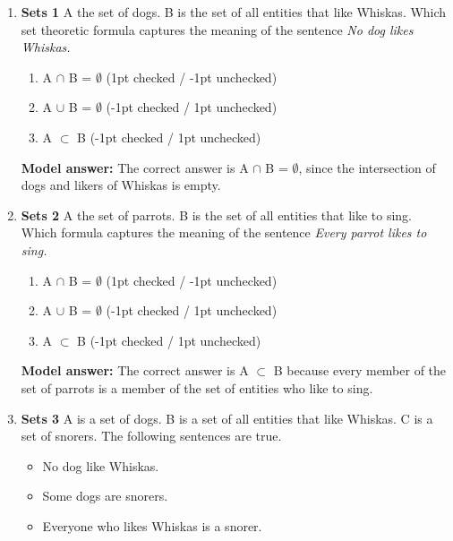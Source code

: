 \documentclass[a4,11pt]{article}
\begin{document}
\begin{enumerate}[leftmargin = 12pt]
{\bf Model answer:}  The correct answer is \textit{Some dogs like Whiskas}, since the intersection between the set of dogs and the set of entities that like Whiskas is not empty.


\item {\bf Sets 1} A  the set of dogs. B is the set of all entities that like Whiskas. Which set theoretic formula captures the meaning of the sentence \textit{No dog likes Whiskas.}

      \begin{enumerate}[noitemsep]
        \item A $\cap$ B = $\emptyset$ (1pt checked / -1pt unchecked)
	\item A $\cup$ B = $\emptyset$  (-1pt checked / 1pt unchecked)
        \item A $\subset$ B (-1pt checked / 1pt unchecked)
	\end{enumerate}	
	
{\bf Model answer:}  The correct answer is  A $\cap$ B = $\emptyset$, since the intersection of dogs and likers of Whiskas is empty. 


\item {\bf Sets 2} A  the set of parrots. B is the set of all entities that like to sing. Which formula captures the meaning of the sentence \textit{Every parrot likes to sing.}

        \begin{enumerate}[noitemsep]
        \item A $\cap$ B = $\emptyset$ (1pt checked / -1pt unchecked)
	\item A $\cup$ B = $\emptyset$  (-1pt checked / 1pt unchecked)
        \item A $\subset$ B (-1pt checked / 1pt unchecked)
	\end{enumerate}	

{\bf Model answer:}  The correct answer is  A $\subset$ B because every member of the set of parrots is a member of the set of entities who like to sing.

\item {\bf Sets 3}  A is a set of dogs. B is a set of all entities that like Whiskas. C is a set of snorers. The following sentences are true. 

\begin{itemize}[noitemsep]
\item No dog like Whiskas.
\item Some dogs are snorers.
\item Everyone who likes Whiskas is a snorer.
\end{itemize}


\end{enumerate}
\end{document}
